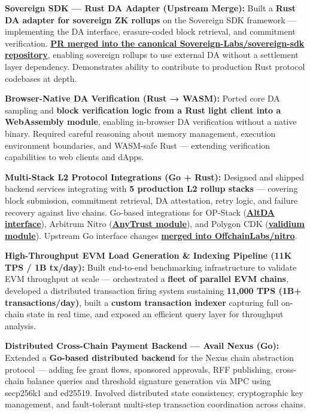 \documentclass[letterpaper,11pt]{article}
\newcommand{\resumeItem}[1]{
  \item\small{{#1 \vspace{-2pt}}}
}
\begin{document}
    \resumeItem{\textbf{Sovereign SDK — Rust DA Adapter (Upstream Merge):} Built a \textbf{Rust DA adapter for sovereign ZK rollups} on the Sovereign SDK framework — implementing the DA interface, erasure-coded block retrieval, and commitment verification. \href{https://github.com/Sovereign-Labs/sovereign-sdk/pull/1709}{\textbf{PR merged into the canonical Sovereign-Labs/sovereign-sdk repository}}, enabling sovereign rollups to use external DA without a settlement layer dependency. Demonstrates ability to contribute to production Rust protocol codebases at depth.}

    \resumeItem{\textbf{Browser-Native DA Verification (Rust → WASM):} Ported core DA sampling and \textbf{block verification logic from a Rust light client into a WebAssembly module}, enabling in-browser DA verification without a native binary. Required careful reasoning about memory management, execution environment boundaries, and WASM-safe Rust — extending verification capabilities to web clients and dApps.}

    \resumeItem{\textbf{Multi-Stack L2 Protocol Integrations (Go + Rust):} Designed and shipped backend services integrating with \textbf{5 production L2 rollup stacks} — covering block submission, commitment retrieval, DA attestation, retry logic, and failure recovery against live chains. Go-based integrations for OP-Stack (\href{https://github.com/availproject/avail-op-stack-adapter}{\textbf{AltDA interface}}), Arbitrum Nitro (\href{https://github.com/availproject/avail-nitro-adapter}{\textbf{AnyTrust module}}), and Polygon CDK (\href{https://github.com/availproject/cdk}{\textbf{validium module}}). Upstream Go interface changes \href{https://github.com/OffchainLabs/nitro/pull/2666}{\textbf{merged into OffchainLabs/nitro}}.}

    \resumeItem{\textbf{High-Throughput EVM Load Generation \& Indexing Pipeline (11K TPS / 1B tx/day):} Built end-to-end benchmarking infrastructure to validate EVM throughput at scale — orchestrated a \textbf{fleet of parallel EVM chains}, developed a distributed transaction firing system sustaining \textbf{11,000 TPS (1B+ transactions/day)}, built a \textbf{custom transaction indexer} capturing full on-chain state in real time, and exposed an efficient query layer for throughput analysis.}

     \resumeItem{\textbf{Distributed Cross-Chain Payment Backend — Avail Nexus (Go):} Extended a \textbf{Go-based distributed backend} for the Nexus chain abstraction protocol — adding fee grant flows, sponsored approvals, RFF publishing, cross-chain balance queries and threshold signature generation via MPC using secp256k1 and ed25519. Involved distributed state consistency, cryptographic key management, and fault-tolerant multi-step transaction coordination across chains.}
\end{document}
